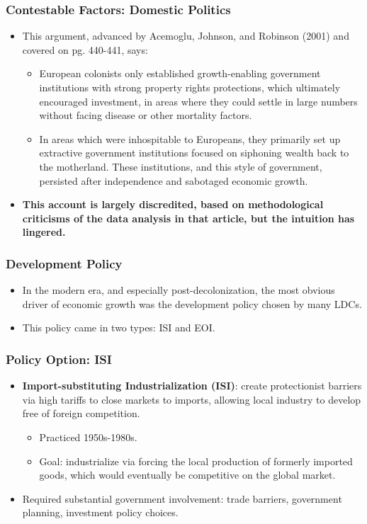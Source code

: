 \documentclass[handout]{beamer}
\begin{document}
\begin{frame} 
	\frametitle{\LARGE{Contestable Factors: Domestic Politics}}
	\begin{itemize}
		\item This argument, advanced by Acemoglu, Johnson, and Robinson (2001) and covered on pg. 440-441, says:
			\begin{itemize}
				\item European colonists only established growth-enabling government institutions with strong property rights protections, which ultimately encouraged investment, in areas where they could settle in large numbers without facing disease or other mortality factors. \pause
				\item In areas which were inhospitable to Europeans, they primarily set up extractive government institutions focused on siphoning wealth back to the motherland. These institutions, and this style of government, persisted after independence and sabotaged economic growth. \pause
			\end{itemize}
		\item \textbf{This account is largely discredited, based on methodological criticisms of the data analysis in that article, but the intuition has lingered.}
	\end{itemize}
\end{frame}

\begin{frame} 
	\frametitle{\LARGE{Development Policy}}
	\begin{itemize}
		\item In the modern era, and especially post-decolonization, the most obvious driver of economic growth was the development policy chosen by many LDCs. \pause
		\item This policy came in two types: ISI and EOI.
	\end{itemize}
\end{frame}


\begin{frame} 
	\frametitle{\LARGE{Policy Option: ISI}}
	\begin{itemize}
			\item \textbf{Import-substituting Industrialization (ISI)}: create protectionist barriers via high tariffs to close markets to imports, allowing local industry to develop free of foreign competition. \pause 
			\begin{itemize}
			    \item Practiced 1950s-1980s. \pause
			    \item Goal: industrialize via forcing the local production of formerly imported goods, which would eventually be competitive on the global market. \pause
			\end{itemize}
		\item Required substantial government involvement: trade barriers, government planning, investment policy choices.

	\end{itemize}
\end{frame}
\end{document}
